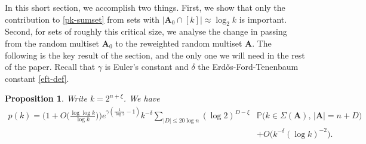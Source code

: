 \documentclass[11pt,reqno]{amsart}
\numberwithin{equation}{section}
\newtheorem{proposition}[theorem]{Proposition}
\theoremstyle{definition}
\theoremstyle{remark}
\newcommand{\mb}{\mathbb}
\newcommand{\mbf}{\mathbf}
\renewcommand{\le}{\leqslant}
\begin{document}
In this short section, we accomplish two things. First, we show that only the contribution to \cref{pk-sumset} from sets with $|\mbf{A}_0 \cap [k]| \approx \log_2 k$ is important. Second, for sets of roughly this critical size, we analyse the change in passing from the random multiset $\mbf{A}_0$ to the reweighted random multiset $\mbf{A}$. The following is the key result of the section, and the only one we will need in the rest of the paper. Recall that $\gamma$ is Euler's constant and $\delta$ the Erd\H{o}s-Ford-Tenenbaum constant \cref{eft-def}.
\begin{proposition} 
\label{key-measure-change} Write $k = 2^{n + \xi}$. We have \begin{align*} p(k) = \Big(1 + O\big(\frac{\log \log k}{\log k} \big)\Big)e^{\gamma(\frac{1}{\log 2} - 1)} k^{-\delta} \sum_{|D| \le 20 \log n}   (\log 2)^{D - \xi} & \mb{P}\big(k \in \Sigma(\mbf{A}), \,|\mbf{A} | = n + D\big) \\ & + O\big(k^{-\delta} (\log k)^{-2}\big).\end{align*} \end{proposition}
\end{document}
